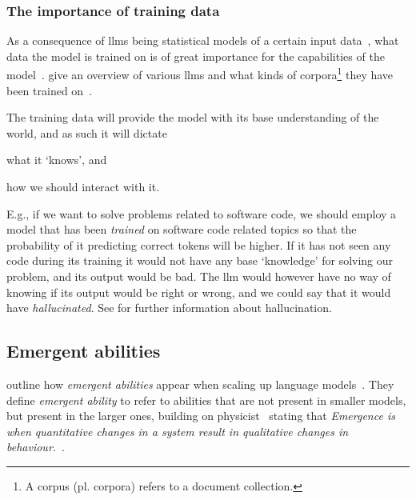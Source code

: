 %

\subsubsection{The importance of training data}

As a consequence of \acrshort{llms} being statistical models of a certain input
data~\cite[1]{llmSurvey}, what data the model is trained on is of great
importance for the capabilities of the model~\cite[6]{llmSurvey}.
\citeauthor{llmSurvey} give an overview of various \acrshort{llms} and what
kinds of corpora\footnote{A corpus (pl. corpora) refers to a document
    collection.} they have been trained on~\cite[11-14]{llmSurvey}.

The training data will provide the model with its base understanding of the
world, and as such it will dictate \begin{inparaenum}
    \item what it `knows', and
    \item how we should interact with it.
\end{inparaenum}
E.g., if we want to solve problems related to software code, we should employ a
model that has been \textit{trained} on software code related topics so that the
probability of it predicting correct tokens will be higher. If it has not seen
any code during its training it would not have any base `knowledge' for solving
our problem, and its output would be bad. The \acrshort{llm} would however have
no way of knowing if its output would be right or wrong, and we could say that
it would have \textit{hallucinated}.
See  for further information
about hallucination.


\subsection{Emergent abilities}\label{sec:emergentAbilities}

\citeauthor{emergentabilitiesLLM} outline how \textit{emergent abilities} appear
when scaling up language models~\cite[1]{emergentabilitiesLLM}. They define
\textit{emergent ability} to refer to abilities that are not present in smaller
models, but present in the larger ones\cite[1]{emergentabilitiesLLM}, building
on physicist~\citeauthor{anderson1972more} stating that \textit{Emergence is
    when quantitative changes in a system result in qualitative changes in
    behaviour.}~\cite[2]{emergentabilitiesLLM}.

